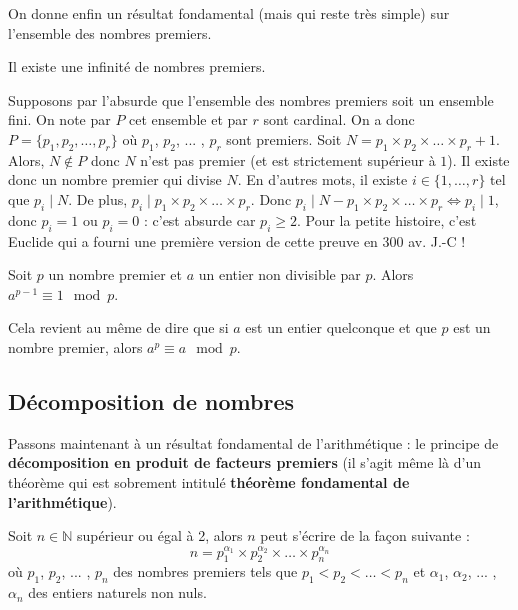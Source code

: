 	On donne enfin un résultat fondamental (mais qui reste très simple) sur l'ensemble des nombres premiers.
	
	\begin{formula}
		Il existe une infinité de nombres premiers.
	\end{formula}
	
	\begin{demonstration}
		Supposons par l'absurde que l'ensemble des nombres premiers soit un ensemble fini. On note par $P$ cet ensemble et par $r$ sont cardinal. On a donc $P = \{p_1, p_2, \dots, p_r\}$ où $p_1$, $p_2$, ... , $p_r$ sont premiers. \newpar
		Soit $N = p_1 \times p_2 \times \dots \times p_r + 1$. Alors, $N \notin P$ donc $N$ n'est pas premier (et est strictement supérieur à $1$). Il existe donc un nombre premier qui divise $N$.
		\newpar
		En d'autres mots, il existe $i \in \{1, \dots, r\}$ tel que $p_i \mid N$. De plus, $p_i \mid p_1 \times p_2 \times \dots \times p_r$.
		\newpar
		Donc $p_i \mid N -  p_1 \times p_2 \times \dots \times p_r \iff p_i \mid 1$, donc $p_i = 1$ ou $p_i = 0$ : c'est absurde car $p_i \geq 2$.
		\newpar
		Pour la petite histoire, c'est Euclide qui a fourni une première version de cette preuve en 300 av. J.-C !
	\end{demonstration}
	
	\begin{formula}
		\label{thm:fermat}
		Soit $p$ un nombre premier et $a$ un entier non divisible par $p$. Alors $a^{p-1} \equiv 1 \mod p$.
	\end{formula}
	
	\begin{tip}
		Cela revient au même de dire que si $a$ est un entier quelconque et que $p$ est un nombre premier, alors $a^p \equiv a \mod p$.
	\end{tip}
	
	\subsection{Décomposition de nombres}
	
	Passons maintenant à un résultat fondamental de l'arithmétique : le principe de \textbf{décomposition en produit de facteurs premiers} (il s'agit même là d'un théorème qui est sobrement intitulé \textbf{théorème fondamental de l'arithmétique}).
	
	\begin{formula}
		Soit $n \in \mathbb{N}$ supérieur ou égal à 2, alors $n$ peut s'écrire de la façon suivante :
		\[ n = p_{1}^{\alpha_1} \times p_{2}^{\alpha_2} \times \dots \times p_{n}^{\alpha_n} \]
		où $p_1$, $p_2$, ... , $p_n$ des nombres premiers tels que $p_1 < p_2 < \dots < p_n$ et $\alpha_1$, $\alpha_2$, ... , $\alpha_n$ des entiers naturels non nuls.
	\end{formula}
	
